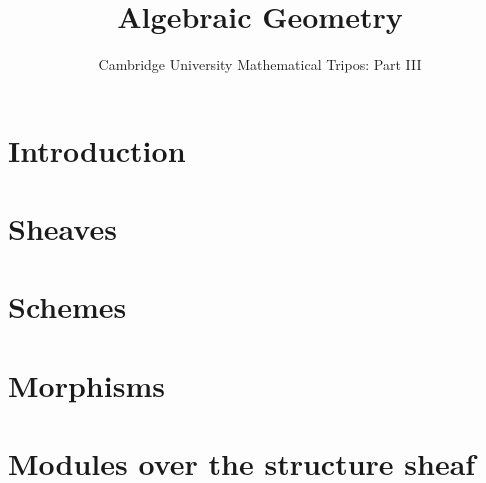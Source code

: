 \documentclass{article}
\title{Algebraic Geometry}
\author{Cambridge University Mathematical Tripos: Part III}
\begin{document}
\maketitle

\tableofcontentsnewpage{}


\section{Introduction}

\section{Sheaves}

\section{Schemes}

\section{Morphisms}

\section{Modules over the structure sheaf}

\end{document}
